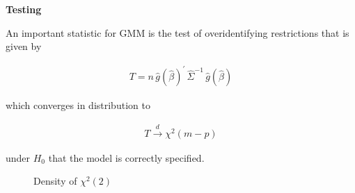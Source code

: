 \begin{frame}\begin{center}
		\LARGE\textbf{Testing}
\end{center}\end{frame}
\begin{frame}
An important statistic for GMM is the test of overidentifying restrictions that is given by

\begin{align*}
T = n\,\hat{g}(\hat{\beta})^\prime \,\hat{\Sigma}^{-1}\,\hat{g}(\hat{\beta})
\end{align*}

which converges in distribution to

\begin{align*}
T \xrightarrow{d} \chi^2(m - p)
\end{align*}

under $H_0$ that the model is correctly specified.

\end{frame}
\begin{frame}
\begin{figure}[htp]\centering
\caption{Density of $\chi^2(2)$}
\end{figure}
\end{frame}
